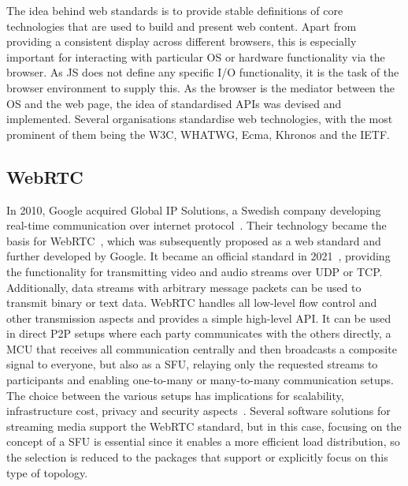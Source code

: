 The idea behind web standards is to provide stable definitions of core technologies that are used to build and present web content.
Apart from providing a consistent display across different browsers, this is especially important for interacting with particular \ac{OS} or hardware functionality via the browser.
As \ac{JS} does not define any specific \ac{I/O} functionality, it is the task of the browser environment to supply this.
As the browser is the mediator between the \ac{OS} and the web page, the idea of standardised \acp{API} was devised and implemented.
Several organisations standardise web technologies, with the most prominent of them being the \ac{W3C}, \ac{WHATWG}, Ecma, Khronos and the \ac{IETF}.

\subsection{WebRTC}
\label{subsec:webrtc}

In 2010, Google acquired Global IP Solutions, a Swedish company developing real-time communication over internet protocol~\parencite{googleGlobalIpAcquisition}.
Their technology became the basis for \ac{WebRTC}~\parencite{webRtcGlobalIPSolutions}, which was subsequently proposed as a web standard and further developed by Google.
It became an official standard in 2021~\parencite{webRtcOfficialWebStandard}, providing the functionality for transmitting video and audio streams over \ac{UDP} or \ac{TCP}.
Additionally, data streams with arbitrary message packets can be used to transmit binary or text data.
WebRTC handles all low-level flow control and other transmission aspects and provides a simple high-level \ac{API}.
It can be used in direct \ac{P2P} setups where each party communicates with the others directly, a \ac{MCU} that receives all communication centrally and then broadcasts a composite signal to everyone, but also as a \ac{SFU}, relaying only the requested streams to participants and enabling one-to-many or many-to-many communication setups.
The choice between the various setups has implications for scalability, infrastructure cost, privacy and security aspects~\parencite{webRtcArchitectures}.
Several software solutions for streaming media support the \ac{WebRTC} standard, but in this case, focusing on the concept of a \ac{SFU} is essential since it enables a more efficient load distribution, so the selection is reduced to the packages that support or explicitly focus on this type of topology.



